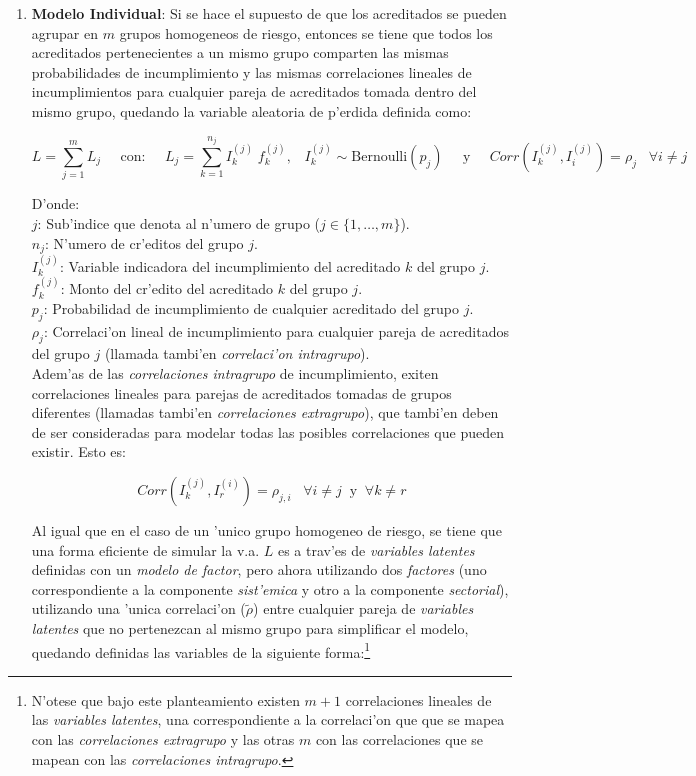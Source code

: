 \documentclass[10pt, oneside]{article}
\begin{document}
\begin{enumerate}

\item{\textbf{Modelo Individual}}: Si se hace el supuesto de que los acreditados se pueden agrupar en $m$ grupos homogeneos de riesgo, entonces se tiene que todos los acreditados pertenecientes a un mismo grupo comparten las mismas probabilidades de incumplimiento y las mismas correlaciones lineales de incumplimientos para cualquier pareja de acreditados tomada dentro del mismo grupo, quedando la variable aleatoria de p'erdida definida como:

\[L = \sum_{j=1}^{m} L_j\;\;\;\;\;\mbox{con:}\;\;\;\;\;L_j = \sum_{k=1}^{n_j} I_k^{(j)}\;f_k^{(j)},\;\;\; I_k^{(j)}\sim\mbox{Bernoulli}(p_j) \;\;\;\;\;\mbox{y}\;\;\;\;\; Corr(I_k^{(j)}, I_i^{(j)}) =\rho_j \;\;\; \forall i \neq j\]

\noindent D'onde:\\
$j$: Sub'indice que denota al n'umero de grupo ($j \in \{ 1, \ldots, m\}$).\\
$n_j$: N'umero de cr'editos del grupo $j$.\\
$I_k^{(j)}$: Variable indicadora del incumplimiento del acreditado $k$ del grupo $j$.\\
$f_k^{(j)}$: Monto del cr'edito del acreditado $k$ del grupo $j$.\\
$p_j$: Probabilidad de incumplimiento de cualquier acreditado del grupo $j$.\\
$\rho_j$: Correlaci'on lineal de incumplimiento para cualquier pareja de acreditados del grupo $j$ (llamada tambi'en \emph{correlaci'on intragrupo}).\\

\noindent
Adem'as de las \emph{correlaciones intragrupo} de incumplimiento, exiten correlaciones lineales para parejas de acreditados tomadas de grupos diferentes (llamadas tambi'en \emph{correlaciones extragrupo}), que tambi'en deben de ser consideradas para modelar todas las posibles correlaciones que pueden existir. Esto es:

\[Corr(I_k^{(j)}, I_r^{(i)}) = \rho_{j,i} \;\;\; \forall i \neq j \;\;\mbox{y}\;\; \forall k \neq r\]

\noindent
Al igual que en el caso de un 'unico grupo homogeneo de riesgo, se tiene que una forma eficiente de simular la v.a. $L$ es a trav'es de \emph{variables latentes} definidas con un \emph{modelo de factor}, pero ahora utilizando dos \emph{factores} (uno correspondiente a la componente \emph{sist'emica} y otro a la componente \emph{sectorial}), utilizando una 'unica correlaci'on ($\widetilde{\rho}$) entre cualquier pareja de \emph{variables latentes} que no pertenezcan al mismo grupo para simplificar el modelo, quedando definidas las variables de la siguiente forma:\footnote{N'otese que bajo este planteamiento existen $m+1$ correlaciones lineales de las \emph{variables latentes}, una correspondiente a la correlaci'on que que se mapea con las \emph{correlaciones extragrupo} y las otras $m$ con las correlaciones que se mapean con las \emph{correlaciones intragrupo}.}


\end{enumerate}
\end{document}
